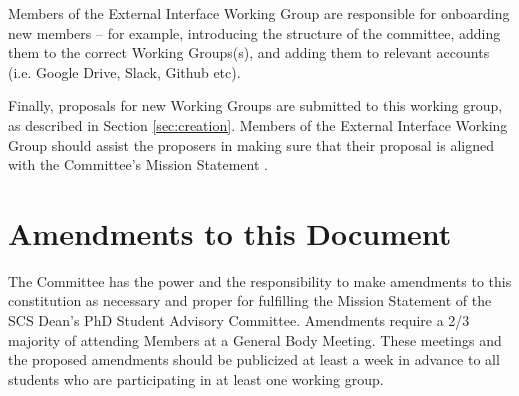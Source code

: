 \documentclass{article}
\begin{document}
Members of the External Interface Working Group are responsible for onboarding new members -- for example, introducing the structure of the committee, adding them to the correct Working Groups(s), and adding them to relevant accounts (i.e. Google Drive, Slack, Github etc).

Finally, proposals for new Working Groups are submitted to this working group, as described in Section \ref{sec:creation}. Members of the External Interface Working Group should assist the proposers in making sure that their proposal is aligned with the Committee's Mission Statement .


\section{Amendments to this Document}
The Committee has the power and the responsibility to make amendments to this constitution as necessary and proper for fulfilling the Mission Statement of the SCS Dean's PhD Student Advisory Committee. Amendments require a 2/3 majority of attending Members at a General Body Meeting. These meetings and the proposed amendments should be publicized at least a week in advance to all students who are participating in at least one working group. 
\end{document}

